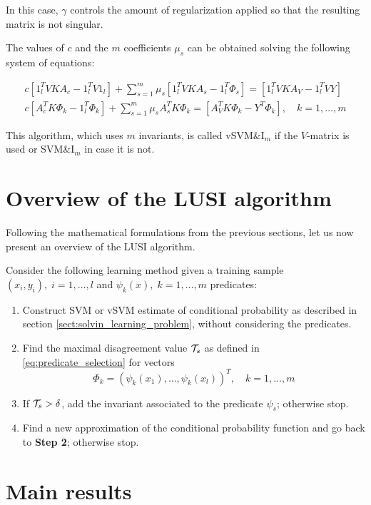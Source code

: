 In this case, $\gamma$ controls the amount of regularization applied so that the resulting matrix is not singular.

The values of $c$ and the $m$ coefficients $\mu_s$ can be obtained solving the following system of equations:

\begin{equation*}
    \begin{gathered}
        c [1_l^T VKA_c - 1_l^T V 1_l] + \sum_{s=1}^m \mu_s [1_l^T VKA_s - 1_l^T \Phi_s] = [1_l^T VKA_V - 1_l^T V Y] \\
        c [A_c^TK\Phi_k - 1_l^T\Phi_k] + \sum_{s=1}^m \mu_s A_s^T K \Phi_k = [A_V^T K \Phi_k - Y^T \Phi_k],\quad k=1, \dots, m
    \end{gathered}
\end{equation*}

This algorithm, which uses $m$ invariants, is called vSVM\&$\text{I}_m$ if the $V$-matrix is used
or SVM\&$\text{I}_m$ in case it is not.

\section{Overview of the LUSI algorithm}

Following the mathematical formulations from the previous sections, let us now present an overview of
the LUSI algorithm.

Consider the following learning method given a training sample $(x_i, y_i),\; i=1, \dots, l$ and
$\psi_k(x),\; k=1, \dots, m$ predicates:

\begin{enumerate}[label=\textbf{Step \arabic*:}]
    \item Construct SVM or vSVM estimate of conditional probability as described in section
    \ref{sect:solvin_learning_problem}, without considering the predicates.
    \item Find the maximal disagreement value $\mathcal{T}_s$ as defined in \eqref{eq:predicate_selection}
    for vectors
    \[
        \Phi_k = (\psi_k(x_1), \dots, \psi_k(x_l))^T,\quad k=1, \dots, m
    \]
    \item If $\mathcal{T}_s > \delta$, add the invariant associated to the predicate $\psi_s$; otherwise stop.
    \item Find a new approximation of the conditional probability function and go back to \textbf{Step 2};
    otherwise stop.
\end{enumerate}

\section{Main results}

